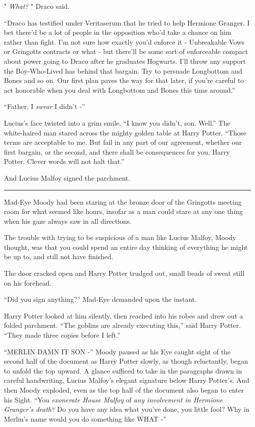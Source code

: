 " \emph{What?} " Draco said.

``Draco has testified under Veritaserum that he tried to help Hermione
Granger. I bet there'd be a lot of people in the opposition who'd take a
chance on him rather than fight. I'm not sure how exactly you'd enforce
it - Unbreakable Vows or Gringotts contracts or what - but there'll be
some sort of enforceable compact about power going to Draco after he
graduates Hogwarts. I'll throw any support the Boy-Who-Lived has behind
that bargain. Try to persuade Longbottom and Bones and so on. Our first
plan paves the way for that later, if you're careful to act honorable
when you deal with Longbottom and Bones this time around.''

``Father, I \emph{swear} I didn't -''

Lucius's face twisted into a grim smile. ``I know you didn't, son.
Well.'' The white-haired man stared across the mighty golden table at
Harry Potter. ``Those terms are acceptable to me. But fail in any part
of our agreement, whether our first bargain, or the second, and there
shall be consequences for you, Harry Potter. Clever words will not halt
that.''

And Lucius Malfoy signed the parchment.

\begin{center}\rule{3in}{0.4pt}\end{center}

Mad-Eye Moody had been staring at the bronze door of the Gringotts
meeting room for what seemed like hours, insofar as a man could stare at
any one thing when his gaze always saw in all directions.

The trouble with trying to be suspicious of a man like Lucius Malfoy,
Moody thought, was that you could spend an entire day thinking of
everything he might be up to, and still not have finished.

The door cracked open and Harry Potter trudged out, small beads of sweat
still on his forehead.

``Did you sign anything?'' Mad-Eye demanded upon the instant.

Harry Potter looked at him silently, then reached into his robes and
drew out a folded parchment. ``The goblins are already executing this,''
said Harry Potter. ``They made three copies before I left.''

``MERLIN DAMN IT SON -'' Moody paused as his Eye caught sight of the
second half of the document as Harry Potter slowly, as though
reluctantly, began to unfold the top upward. A glance sufficed to take
in the paragraphs drawn in careful handwriting, Lucius Malfoy's elegant
signature below Harry Potter's. And then Moody exploded, even as the top
half of the document also began to enter his Sight. ``You
\emph{exonerate House Malfoy} of \emph{any involvement in Hermione
Granger's death?} Do you have any idea what you've done, you little
fool? Why in Merlin's name would you do something like WHAT -''
